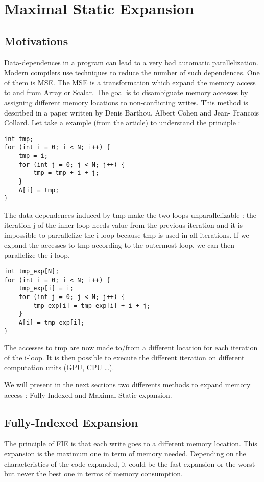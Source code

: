 \chapter{Maximal Static Expansion}\label{ch:MSE}

\section{Motivations}
Data-dependences in a program can lead to a very bad automatic parallelization. Modern compilers use techniques to reduce the number of such dependences. One of them is \ac{MSE}. The \ac{MSE} is a transformation which expand the memory access to and from Array or Scalar. The goal is to disambiguate memory accesses by assigning different memory locations to non-conflicting writes. This method is described in a paper written by Denis Barthou, Albert Cohen and Jean- Francois Collard\cite{MSE}. Let take a example (from the article) to understand the principle :
\begin{lstlisting}[frame=single]
int tmp;
for (int i = 0; i < N; i++) {
    tmp = i;
    for (int j = 0; j < N; j++) {
        tmp = tmp + i + j;
    }
    A[i] = tmp;
}
\end{lstlisting}

The data-dependences induced by tmp make the two loops unparallelizable : the iteration j of the inner-loop needs value from the previous iteration and it is impossible to parrallelize the i-loop because tmp is used in all iterations. If we expand the accesses to tmp according to the outermost loop, we can then parallelize the i-loop.

\begin{lstlisting}[frame=single]
int tmp_exp[N];
for (int i = 0; i < N; i++) {
    tmp_exp[i] = i;
    for (int j = 0; j < N; j++) {
        tmp_exp[i] = tmp_exp[i] + i + j;
    }
    A[i] = tmp_exp[i];
}
\end{lstlisting}

The accesses to tmp are now made to/from a different location for each iteration of the i-loop. It is then possible to execute the different iteration on different computation units (\ac{GPU}, \ac{CPU} …).

We will present in the next sections two differents methods to expand memory access : Fully-Indexed and Maximal Static expansion.

\section{Fully-Indexed Expansion}
The principle of \ac{FIE} is that each write goes to a different memory location. This expansion is the maximum one in term of memory needed. Depending on the characteristics of the code expanded, it could be the fast expansion or the worst but never the best one in terms of memory consumption.

